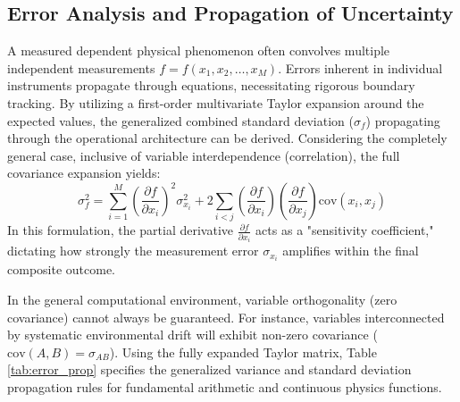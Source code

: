 \documentclass[aps, reprint, twocolumn, superscriptaddress, floatfix]{revtex4-2}
\begin{document}
\subsection{Error Analysis and Propagation of Uncertainty}
A measured dependent physical phenomenon often convolves multiple independent measurements $f = f(x_1, x_2, \dots, x_M)$. Errors inherent in individual instruments propagate through equations, necessitating rigorous boundary tracking. By utilizing a first-order multivariate Taylor expansion around the expected values, the generalized combined standard deviation ($\sigma_f$) propagating through the operational architecture can be derived. Considering the completely general case, inclusive of variable interdependence (correlation), the full covariance expansion yields:
\begin{equation}
    \sigma_f^2 = \sum_{i=1}^{M} \left( \frac{\partial f}{\partial x_i} \right)^2 \sigma_{x_i}^2 + 2 \sum_{i<j} \left( \frac{\partial f}{\partial x_i} \right) \left( \frac{\partial f}{\partial x_j} \right) \text{cov}(x_i, x_j)
\end{equation}
In this formulation, the partial derivative $\frac{\partial f}{\partial x_i}$ acts as a "sensitivity coefficient," dictating how strongly the measurement error $\sigma_{x_i}$ amplifies within the final composite outcome. 

In the general computational environment, variable orthogonality (zero covariance) cannot always be guaranteed. For instance, variables interconnected by systematic environmental drift will exhibit non-zero covariance ($\text{cov}(A, B) = \sigma_{AB}$). Using the fully expanded Taylor matrix, Table \ref{tab:error_prop} specifies the generalized variance and standard deviation propagation rules for fundamental arithmetic and continuous physics functions.
\end{document}
